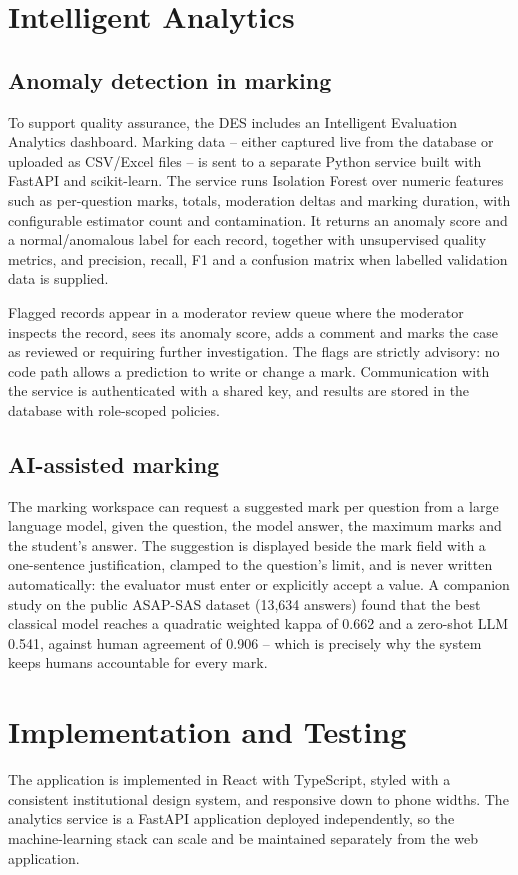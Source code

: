 \documentclass[conference]{IEEEtran}
\begin{document}
\section{Intelligent Analytics}
\subsection{Anomaly detection in marking}
To support quality assurance, the DES includes an Intelligent Evaluation Analytics dashboard. Marking data -- either captured live from the database or uploaded as CSV/Excel files -- is sent to a separate Python service built with FastAPI and scikit-learn. The service runs Isolation Forest \cite{liu2008} over numeric features such as per-question marks, totals, moderation deltas and marking duration, with configurable estimator count and contamination. It returns an anomaly score and a normal/anomalous label for each record, together with unsupervised quality metrics, and precision, recall, F1 and a confusion matrix when labelled validation data is supplied.

Flagged records appear in a moderator review queue where the moderator inspects the record, sees its anomaly score, adds a comment and marks the case as reviewed or requiring further investigation. The flags are strictly advisory: no code path allows a prediction to write or change a mark. Communication with the service is authenticated with a shared key, and results are stored in the database with role-scoped policies.

\subsection{AI-assisted marking}
The marking workspace can request a suggested mark per question from a large language model, given the question, the model answer, the maximum marks and the student's answer. The suggestion is displayed beside the mark field with a one-sentence justification, clamped to the question's limit, and is never written automatically: the evaluator must enter or explicitly accept a value. A companion study on the public ASAP-SAS dataset (13,634 answers) found that the best classical model reaches a quadratic weighted kappa of 0.662 and a zero-shot LLM 0.541, against human agreement of 0.906 -- which is precisely why the system keeps humans accountable for every mark.

\section{Implementation and Testing}
The application is implemented in React with TypeScript, styled with a consistent institutional design system, and responsive down to phone widths. The analytics service is a FastAPI application deployed independently, so the machine-learning stack can scale and be maintained separately from the web application.
\end{document}
